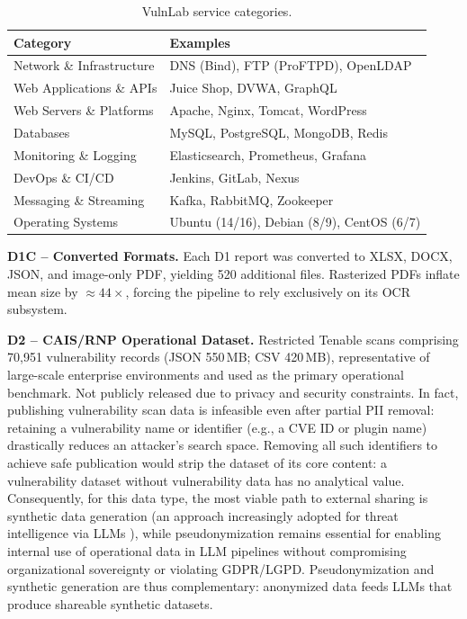 \documentclass[12pt]{article}
\begin{document}
\begin{table}[!htp]
\centering
\caption{VulnLab service categories.}
\label{tab:vulnlab_categories}
\scriptsize
\begin{tabular}{ll}
\hline
\textbf{Category} & \textbf{Examples} \\
\hline
Network \& Infrastructure  & DNS (Bind), FTP (ProFTPD), OpenLDAP \\
Web Applications \& APIs   & Juice Shop, DVWA, GraphQL \\
Web Servers \& Platforms   & Apache, Nginx, Tomcat, WordPress \\
Databases                  & MySQL, PostgreSQL, MongoDB, Redis \\
Monitoring \& Logging      & Elasticsearch, Prometheus, Grafana \\
DevOps \& CI/CD            & Jenkins, GitLab, Nexus \\
Messaging \& Streaming     & Kafka, RabbitMQ, Zookeeper \\
Operating Systems          & Ubuntu (14/16), Debian (8/9), CentOS (6/7) \\
\hline
\end{tabular}
\end{table}

\textbf{D1C -- Converted Formats.}
Each D1 report was converted to XLSX, DOCX, JSON, and image-only PDF, yielding
520 additional files. Rasterized PDFs inflate mean size by ${\approx}44\times$,
forcing the pipeline to rely exclusively on its OCR subsystem.

\textbf{D2 -- CAIS/RNP Operational Dataset.}
Restricted Tenable scans comprising 70{,}951 vulnerability records (JSON 550\,MB;
CSV 420\,MB), representative of large-scale enterprise environments and used as the
primary operational benchmark. Not publicly released due to privacy and security constraints. In fact, publishing vulnerability scan data is infeasible even after partial PII removal: retaining a vulnerability name or identifier (e.g., a CVE ID or plugin name) drastically reduces an attacker's search space. Removing all such identifiers to achieve safe publication would strip the dataset of its core content: a vulnerability dataset without vulnerability data has no analytical value. Consequently, for this data type, the most viable path to external sharing is synthetic data generation (an approach increasingly adopted for threat intelligence via LLMs \cite{almorjan2025synthetic}), while pseudonymization remains essential for enabling internal use of operational data in LLM pipelines without compromising organizational sovereignty or violating GDPR/LGPD. Pseudonymization and synthetic generation are thus complementary: anonymized data feeds LLMs that produce shareable synthetic datasets.
\end{document}
